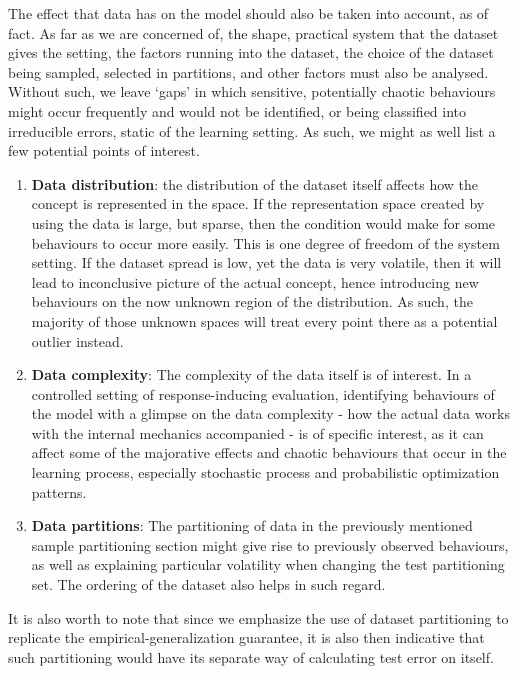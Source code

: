 \documentclass[10pt]{article} %
\begin{document}
The effect that data has on the model should also be taken into account, as of fact. As far as we are concerned of, the shape, practical system that the dataset gives the setting, the factors running into the dataset, the choice of the dataset being sampled, selected in partitions, and other factors must also be analysed. Without such, we leave `gaps' in which sensitive, potentially chaotic behaviours might occur frequently and would not be identified, or being classified into irreducible errors, static of the learning setting. As such, we might as well list a few potential points of interest. 
\begin{enumerate}[itemsep=1pt,topsep=0.5pt]
  \item \textbf{Data distribution}: the distribution of the dataset itself affects how the concept is represented in the space. If the representation space created by using the data is large, but sparse, then the condition would make for some behaviours to occur more easily. This is one degree of freedom of the system setting. If the dataset spread is low, yet the data is very volatile, then it will lead to inconclusive picture of the actual concept, hence introducing new behaviours on the now unknown region of the distribution. As such, the majority of those unknown spaces will treat every point there as a potential outlier instead. 
  \item \textbf{Data complexity}: The complexity of the data itself is of interest. In a controlled setting of response-inducing evaluation, identifying behaviours of the model with a glimpse on the data complexity - how the actual data works with the internal mechanics accompanied - is of specific interest, as it can affect some of the majorative effects and chaotic behaviours that occur in the learning process, especially stochastic process and probabilistic optimization patterns. 
  \item \textbf{Data partitions}: The partitioning of data in the previously mentioned sample partitioning section might give rise to previously observed behaviours, as well as explaining particular volatility when changing the test partitioning set. The ordering of the dataset also helps in such regard. 
\end{enumerate}
It is also worth to note that since we emphasize the use of dataset partitioning to replicate the empirical-generalization guarantee, it is also then indicative that such partitioning would have its separate way of calculating test error on itself. 
\end{document}
